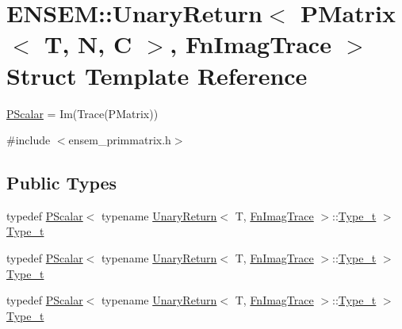 \hypertarget{structENSEM_1_1UnaryReturn_3_01PMatrix_3_01T_00_01N_00_01C_01_4_00_01FnImagTrace_01_4}{}\section{E\+N\+S\+EM\+:\+:Unary\+Return$<$ P\+Matrix$<$ T, N, C $>$, Fn\+Imag\+Trace $>$ Struct Template Reference}
\label{structENSEM_1_1UnaryReturn_3_01PMatrix_3_01T_00_01N_00_01C_01_4_00_01FnImagTrace_01_4}


\mbox{\hyperlink{classENSEM_1_1PScalar}{P\+Scalar}} = Im(\+Trace(\+P\+Matrix))  




{\ttfamily \#include $<$ensem\+\_\+primmatrix.\+h$>$}

\subsection*{Public Types}
\begin{DoxyCompactItemize}
\item 
typedef \mbox{\hyperlink{classENSEM_1_1PScalar}{P\+Scalar}}$<$ typename \mbox{\hyperlink{structENSEM_1_1UnaryReturn}{Unary\+Return}}$<$ T, \mbox{\hyperlink{structENSEM_1_1FnImagTrace}{Fn\+Imag\+Trace}} $>$\+::\mbox{\hyperlink{structENSEM_1_1UnaryReturn_3_01PMatrix_3_01T_00_01N_00_01C_01_4_00_01FnImagTrace_01_4_a631e4d167f62becbde56ab9d33138ccd}{Type\+\_\+t}} $>$ \mbox{\hyperlink{structENSEM_1_1UnaryReturn_3_01PMatrix_3_01T_00_01N_00_01C_01_4_00_01FnImagTrace_01_4_a631e4d167f62becbde56ab9d33138ccd}{Type\+\_\+t}}
\item 
typedef \mbox{\hyperlink{classENSEM_1_1PScalar}{P\+Scalar}}$<$ typename \mbox{\hyperlink{structENSEM_1_1UnaryReturn}{Unary\+Return}}$<$ T, \mbox{\hyperlink{structENSEM_1_1FnImagTrace}{Fn\+Imag\+Trace}} $>$\+::\mbox{\hyperlink{structENSEM_1_1UnaryReturn_3_01PMatrix_3_01T_00_01N_00_01C_01_4_00_01FnImagTrace_01_4_a631e4d167f62becbde56ab9d33138ccd}{Type\+\_\+t}} $>$ \mbox{\hyperlink{structENSEM_1_1UnaryReturn_3_01PMatrix_3_01T_00_01N_00_01C_01_4_00_01FnImagTrace_01_4_a631e4d167f62becbde56ab9d33138ccd}{Type\+\_\+t}}
\item 
typedef \mbox{\hyperlink{classENSEM_1_1PScalar}{P\+Scalar}}$<$ typename \mbox{\hyperlink{structENSEM_1_1UnaryReturn}{Unary\+Return}}$<$ T, \mbox{\hyperlink{structENSEM_1_1FnImagTrace}{Fn\+Imag\+Trace}} $>$\+::\mbox{\hyperlink{structENSEM_1_1UnaryReturn_3_01PMatrix_3_01T_00_01N_00_01C_01_4_00_01FnImagTrace_01_4_a631e4d167f62becbde56ab9d33138ccd}{Type\+\_\+t}} $>$ \mbox{\hyperlink{structENSEM_1_1UnaryReturn_3_01PMatrix_3_01T_00_01N_00_01C_01_4_00_01FnImagTrace_01_4_a631e4d167f62becbde56ab9d33138ccd}{Type\+\_\+t}}
\end{DoxyCompactItemize}


